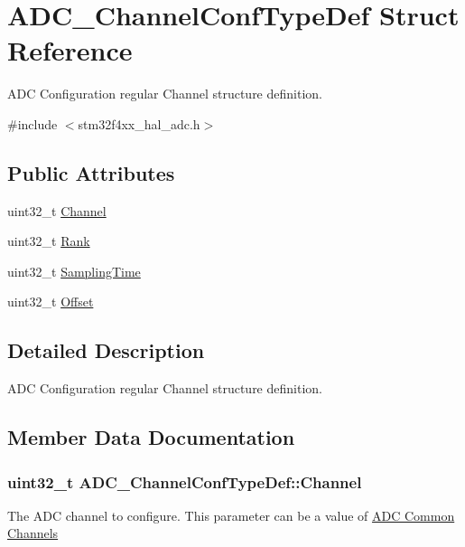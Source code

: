 \hypertarget{struct_a_d_c___channel_conf_type_def}{}\section{A\+D\+C\+\_\+\+Channel\+Conf\+Type\+Def Struct Reference}
\label{struct_a_d_c___channel_conf_type_def}


A\+DC Configuration regular Channel structure definition.  




{\ttfamily \#include $<$stm32f4xx\+\_\+hal\+\_\+adc.\+h$>$}

\subsection*{Public Attributes}
\begin{DoxyCompactItemize}
\item 
uint32\+\_\+t \hyperlink{struct_a_d_c___channel_conf_type_def_a771e64a3695f61cb1cce4fd65e956f6b}{Channel}
\item 
uint32\+\_\+t \hyperlink{struct_a_d_c___channel_conf_type_def_a106e52a928aefb7778802bac0b75cf2d}{Rank}
\item 
uint32\+\_\+t \hyperlink{struct_a_d_c___channel_conf_type_def_ae9486a657d515b87e2c2853db59afaaa}{Sampling\+Time}
\item 
uint32\+\_\+t \hyperlink{struct_a_d_c___channel_conf_type_def_a481e92707be00870f495e8a63c6cc788}{Offset}
\end{DoxyCompactItemize}


\subsection{Detailed Description}
A\+DC Configuration regular Channel structure definition. 

\subsection{Member Data Documentation}
\subsubsection[{\texorpdfstring{Channel}{Channel}}]{\setlength{\rightskip}{0pt plus 5cm}uint32\+\_\+t A\+D\+C\+\_\+\+Channel\+Conf\+Type\+Def\+::\+Channel}\hypertarget{struct_a_d_c___channel_conf_type_def_a771e64a3695f61cb1cce4fd65e956f6b}{}\label{struct_a_d_c___channel_conf_type_def_a771e64a3695f61cb1cce4fd65e956f6b}
The A\+DC channel to configure. This parameter can be a value of \hyperlink{group___a_d_c__channels}{A\+DC Common Channels} 
